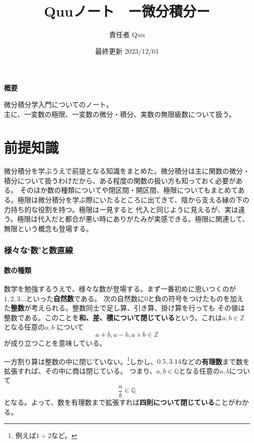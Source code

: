 \documentclass[a4j,dvipdfmx]{jsarticle}
\title{Quuノート　ー微分積分\ajRoman{1}ー}
\date{最終更新 2023/12/01}
\author{責任者 Quu}
\begin{document}
    \maketitle
    \thispagestyle{empty}
    \centerline{\textbf{概要}}
    \noindent
    微分積分学入門についてのノート。\\
    主に、一変数の極限、一変数の微分・積分、実数の無限級数について扱う。
    
    \clearpage
    \tableofcontents
    \clearpage
    
    \part{前提知識}
    \begin{screen}
        微分積分を学ぶうえで前提となる知識をまとめた。微分積分は主に関数の微分・積分について扱うわけだから、ある程度の関数の扱い方も知っておく必要がある。
        そのほか数の種類についてや閉区間・開区間、極限についてもまとめてある。極限は微分積分を学ぶ際にいたるところに出てきて、陰から支える縁の下の力持ち的な役割を持つ。極限は一見すると
        代入と同じように見えるが、実は違う。極限は代入だと都合が悪い時にありがたみが実感できる。極限に関連して、無限という概念も登場する。
    \end{screen}
    \clearpage
    \section{様々な`数'と数直線}
        \subsection{数の種類}
            数学を勉強するうえで、様々な数が登場する。まず一番初めに思いつくのが$1,2,3...$といった\textbf{自然数}である。
            次の自然数に$0$と負の符号をつけたものを加えた\textbf{整数}が考えられる。整数同士で足し算、引き算、掛け算を行っても
            その値は整数である。このことを\textbf{和、差、積について閉じている}という。これは$a,b\in \mathbb{Z}$となる任意の$a,b$
            について
            \begin{equation}
                a+b , a-b , a\times b \in \mathbb{Z}
            \end{equation}
            が成り立つことを意味している。

            一方割り算は整数の中に閉じていない。\footnote{例えば$1\div 2$など。}しかし、$0.5,3.14$などの\textbf{有理数}まで数を拡張すれば、その中に商は閉じている。
            つまり、$a,b \in \mathbb{Q}$となる任意の$a,b$について
            \begin{equation}
                \frac{a}{b} \in \mathbb{Q}
            \end{equation}
            となる。よって、数を有理数まで拡張すれば\textbf{四則について閉じている}ことがわかる。
\end{document}
